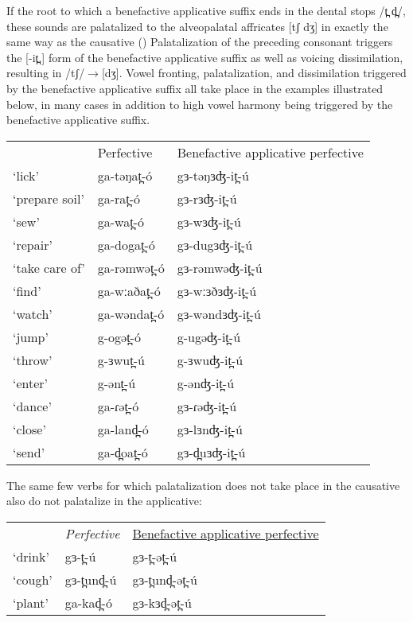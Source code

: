 If the root to which a benefactive applicative suffix ends in the dental stops /t̪ d̪/, these sounds are palatalized to the alveopalatal affricates [tʃ dʒ] in exactly the same way as the causative () Palatalization of the preceding consonant triggers the [-it̪.] form of the benefactive applicative suffix as well as voicing dissimilation, resulting in /tʃ/$\rightarrow$[dʒ]. Vowel fronting, palatalization, and dissimilation triggered by the benefactive applicative suffix all take place in the examples illustrated below, in many cases in addition to high vowel harmony being triggered by the benefactive applicative suffix.
\ea
\begin{tabular}[t]{lll}
&	Perfective	&	Benefactive applicative perfective\\
‘lick’ 			& ga-təŋat̪-ó	&	gɜ-təŋɜʤ-it̪-ú\\
‘prepare soil’	&	ga-rat̪-ó	&	gɜ-rɜʤ-it̪-ú\\
‘sew’			&	ga-wat̪-ó	&	gɜ-wɜʤ-it̪-ú\\
‘repair’		&	ga-dogat̪-ó	&	gɜ-dugɜʤ-it̪-ú\\
‘take care of’	&	ga-rəmwət̪-ó	&	gɜ-rəmwəʤ-it̪-ú\\
‘find’			&	ga-wːaðat̪-ó	&	gɜ-wːɜðɜʤ-it̪-ú\\
‘watch’			&	ga-wəndat̪-ó	&	gɜ-wəndɜʤ-it̪-ú\\
‘jump’			&	g-ogət̪-ó		&	g-ugəʤ-it̪-ú\\
‘throw’			&	g-ɜwut̪-ú		&	g-ɜwuʤ-it̪-ú\\
‘enter’			&	g-ənt̪-ú		&	g-ənʤ-it̪-ú\\
‘dance’			&	ga-ɾət̪-ó	&	gɜ-ɾəʤ-it̪-ú\\
‘close’			&	ga-land̪-ó	&	gɜ-lɜnʤ-it̪-ú\\
‘send’			&	ga-d̪oat̪-ó	&	gɜ-d̪uɜʤ-it̪-ú\\
\end{tabular}
\z
The same few verbs for which palatalization does not take place in the causative also do not palatalize in the applicative:

\ea
\begin{tabular}[t]{lll}
&	\textit{Perfective}	&	\underline{Benefactive applicative perfective}\\
‘drink’	&	gɜ-t̪-ú	&	gɜ-t̪-ət̪-ú\\
‘cough’	&	gɜ-t̪und̪-ú	&	gɜ-t̪und̪-ət̪-ú\\
‘plant’	&	ga-kad̪-ó	&	gɜ-kɜd̪-ət̪-ú\\
\end{tabular}
\z

